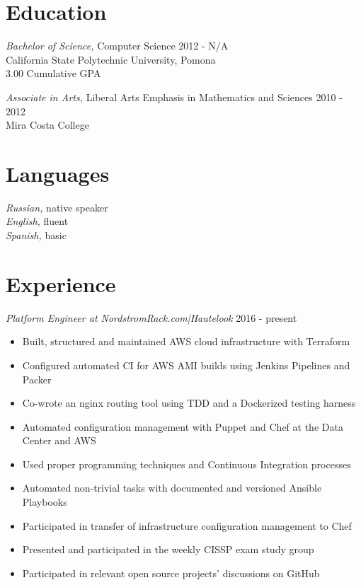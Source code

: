 \documentclass[line]{tex/res}
\begin{document}
\address{}
\address{Email: me@smaslennikov.com}

\begin{resume}

\section{Education}
\vspace{0.1in}
	{\sl Bachelor of Science,} Computer Science \hfill 2012 - N/A\\
	California State Polytechnic University, Pomona \\
	3.00 Cumulative GPA

	{\sl Associate in Arts,} Liberal Arts Emphasis in Mathematics and Sciences \hfill 2010 - 2012 \\
	Mira Costa College

\section{Languages}
	{\sl Russian,} native speaker \\
	{\sl English,} fluent \\
    {\sl Spanish,} basic

\section{Experience}
    {\sl Platform Engineer at NordstromRack.com|Hautelook} \hfill 2016 - present
    \begin{itemize} \itemsep -2pt %
        \item Built, structured and maintained AWS cloud infrastructure with Terraform
        \item Configured automated CI for AWS AMI builds using Jenkins Pipelines and Packer
        \item Co-wrote an nginx routing tool using TDD and a Dockerized testing harness
        \item Automated configuration management with Puppet and Chef at the Data Center and AWS
        \item Used proper programming techniques and Continuous Integration processes
        \item Automated non-trivial tasks with documented and versioned Ansible Playbooks
        \item Participated in transfer of infrastructure configuration management to Chef
        \item Presented and participated in the weekly CISSP exam study group
        \item Participated in relevant open source projects' discussions on GitHub
    \end{itemize}


\end{resume}
\end{document}
